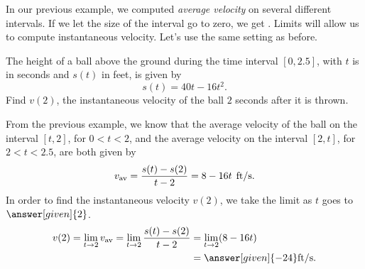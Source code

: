 \documentclass{ximera}
\begin{document}
In our previous example, we computed \textit{average velocity} on
several different intervals. If we let the size of the interval go to
zero, we get . Limits will allow us to
compute instantaneous velocity.  Let's use the same setting as before.

\begin{example}
The height of a ball above the ground during the time interval  $[0,2.5]$, with $t$ is in seconds and $s(t)$ in feet, 
is given by
\[
s(t) = 40t - 16t^2.
\] 
Find $v(2)$, the instantaneous velocity of the ball $2$ seconds after it
is thrown.

\begin{explanation}
From the previous example, we know that the average velocity of the
ball on the interval $[t,2]$, for $0<t<2$, and the average velocity
on the interval $[2,t]$, for $2<t<2.5$, are both given by
\[
v_{\text{av}} =  \frac{s(t)-s(2)}{t-2}= 8-16t \hspace{0.06in}\text{ft/s}.
\]
In order to find the instantaneous velocity $v(2)$, we 
take the limit as $t$ goes to $\answer[given]{2}$. 
\begin{align*}
v (2)= \lim_{t\to2}v_{\text{av}}
=\lim_{t\to2}  \frac{s(t)-s(2)}{t-2}
&= \lim_{t\to2}(8-16t)\\
&= \answer[given]{-24}\text{ft/s}.
\end{align*}
\end{explanation}
\end{example}
\end{document}
